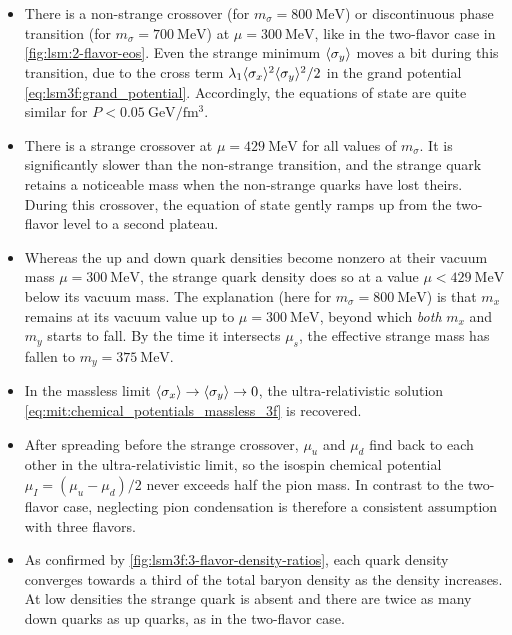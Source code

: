 \begin{itemize}
\item There is a non-strange crossover (for $m_\sigma=\SI{800}{\mega\electronvolt}$)
      or discontinuous phase transition (for $m_\sigma=\SI{700}{\mega\electronvolt}$)
      at $\mu=\SI{300}{\mega\electronvolt}$, like in the two-flavor case in \cref{fig:lsm:2-flavor-eos}.
      Even the strange minimum $\langle \sigma_y \rangle$ moves a bit during this transition, due to the cross term $\lambda_1 \langle \sigma_x \rangle^2 \langle \sigma_y \rangle^2 / 2$ in the grand potential \eqref{eq:lsm3f:grand_potential}.
      Accordingly, the equations of state are quite similar for $P < \SI{0.05}{\giga\electronvolt\per\femto\meter\cubed}$.
\item There is a strange crossover at $\mu = \SI{429}{\mega\electronvolt}$ for all values of $m_\sigma$.
      It is significantly slower than the non-strange transition, and the strange quark retains a noticeable mass when the non-strange quarks have lost theirs.
      During this crossover, the equation of state gently ramps up from the two-flavor level to a second plateau.
\item Whereas the up and down quark densities become nonzero at their vacuum mass $\mu = \SI{300}{\mega\electronvolt}$,
      the strange quark density does so at a value $\mu < \SI{429}{\mega\electronvolt}$ below its vacuum mass.
      The explanation (here for $m_\sigma=\SI{800}{\mega\electronvolt}$) is that $m_x$ remains at its vacuum value up to $\mu = \SI{300}{\mega\electronvolt}$,
      beyond which \emph{both} $m_x$ and $m_y$ starts to fall.
      By the time it intersects $\mu_s$, the effective strange mass has fallen to $m_y = \SI{375}{\mega\electronvolt}$.
\item In the massless limit $\langle \sigma_x \rangle \rightarrow \langle \sigma_y \rangle \rightarrow 0$, the ultra-relativistic solution \eqref{eq:mit:chemical_potentials_massless_3f} is recovered.
\item After spreading before the strange crossover, $\mu_u$ and $\mu_d$ find back to each other in the ultra-relativistic limit,
      so the isospin chemical potential $\mu_I=(\mu_u-\mu_d)/2$ never exceeds half the pion mass.
      In contrast to the two-flavor case, neglecting pion condensation is therefore a consistent assumption with three flavors.
\item As confirmed by \cref{fig:lsm3f:3-flavor-density-ratios}, each quark density converges towards a third of the total baryon density as the density increases.
      At low densities the strange quark is absent and there are twice as many down quarks as up quarks, as in the two-flavor case.

\end{itemize}
